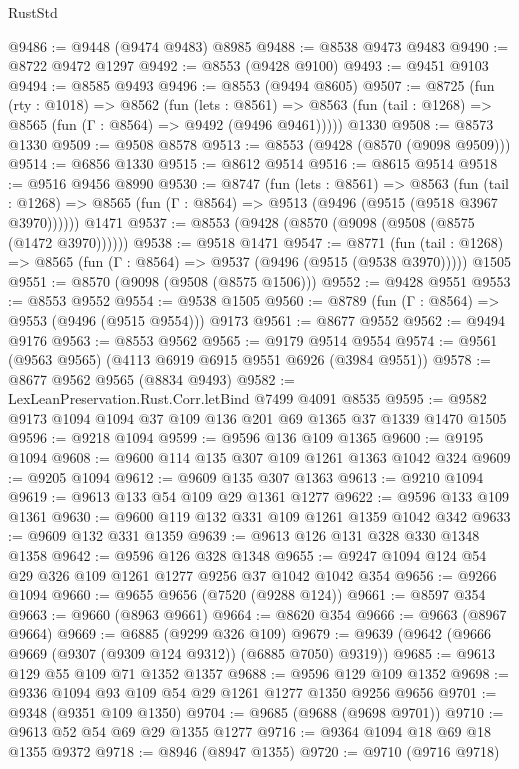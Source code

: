 \begin{lexlean}{RustStd}
\begin{coremodule}
@9486 := @9448 (@9474 @9483) @8985
@9488 := @8538 @9473 @9483
@9490 := @8722 @9472 @1297
@9492 := @8553 (@9428 @9100)
@9493 := @9451 @9103
@9494 := @8585 @9493
@9496 := @8553 (@9494 @8605)
@9507 := @8725
    (fun (rty : @1018) =>
    @8562
      (fun (lets : @8561) =>
      @8563 (fun (tail : @1268) => @8565 (fun (Γ : @8564) => @9492 (@9496 @9461)))))
    @1330
@9508 := @8573 @1330
@9509 := @9508 @8578
@9513 := @8553 (@9428 (@8570 (@9098 @9509)))
@9514 := @6856 @1330
@9515 := @8612 @9514
@9516 := @8615 @9514
@9518 := @9516 @9456 @8990
@9530 := @8747
    (fun (lets : @8561) =>
    @8563
      (fun (tail : @1268) => @8565 (fun (Γ : @8564) => @9513 (@9496 (@9515 (@9518 @3967 @3970))))))
    @1471
@9537 := @8553 (@9428 (@8570 (@9098 (@9508 (@8575 (@1472 @3970))))))
@9538 := @9518 @1471
@9547 := @8771
    (fun (tail : @1268) => @8565 (fun (Γ : @8564) => @9537 (@9496 (@9515 (@9538 @3970)))))
    @1505
@9551 := @8570 (@9098 (@9508 (@8575 @1506)))
@9552 := @9428 @9551
@9553 := @8553 @9552
@9554 := @9538 @1505
@9560 := @8789 (fun (Γ : @8564) => @9553 (@9496 (@9515 @9554))) @9173
@9561 := @8677 @9552
@9562 := @9494 @9176
@9563 := @8553 @9562
@9565 := @9179 @9514 @9554
@9574 := @9561 (@9563 @9565) (@4113 @6919 @6915 @9551 @6926 (@3984 @9551))
@9578 := @8677 @9562 @9565 (@8834 @9493)
@9582 := LexLeanPreservation.Rust.Corr.letBind @7499 @4091 @8535
@9595 := @9582 @9173 @1094 @1094 @37 @109 @136 @201 @69 @1365 @37 @1339 @1470 @1505
@9596 := @9218 @1094
@9599 := @9596 @136 @109 @1365
@9600 := @9195 @1094
@9608 := @9600 @114 @135 @307 @109 @1261 @1363 @1042 @324
@9609 := @9205 @1094
@9612 := @9609 @135 @307 @1363
@9613 := @9210 @1094
@9619 := @9613 @133 @54 @109 @29 @1361 @1277
@9622 := @9596 @133 @109 @1361
@9630 := @9600 @119 @132 @331 @109 @1261 @1359 @1042 @342
@9633 := @9609 @132 @331 @1359
@9639 := @9613 @126 @131 @328 @330 @1348 @1358
@9642 := @9596 @126 @328 @1348
@9655 := @9247 @1094 @124 @54 @29 @326 @109 @1261 @1277 @9256 @37 @1042 @1042 @354
@9656 := @9266 @1094
@9660 := @9655 @9656 (@7520 (@9288 @124))
@9661 := @8597 @354
@9663 := @9660 (@8963 @9661)
@9664 := @8620 @354
@9666 := @9663 (@8967 @9664)
@9669 := @6885 (@9299 @326 @109)
@9679 := @9639 (@9642 (@9666 @9669 (@9307 (@9309 @124 @9312)) (@6885 @7050) @9319))
@9685 := @9613 @129 @55 @109 @71 @1352 @1357
@9688 := @9596 @129 @109 @1352
@9698 := @9336 @1094 @93 @109 @54 @29 @1261 @1277 @1350 @9256 @9656
@9701 := @9348 (@9351 @109 @1350)
@9704 := @9685 (@9688 (@9698 @9701))
@9710 := @9613 @52 @54 @69 @29 @1355 @1277
@9716 := @9364 @1094 @18 @69 @18 @1355 @9372
@9718 := @8946 (@8947 @1355)
@9720 := @9710 (@9716 @9718)

\end{coremodule}
\end{lexlean}
